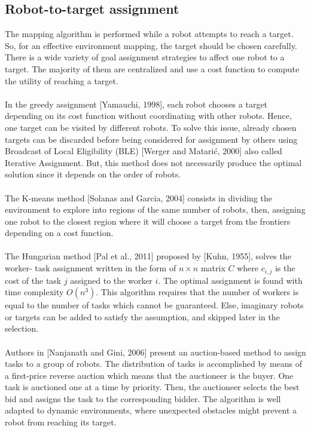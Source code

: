 \documentclass[11pt,openany]{book}
\begin{document}
\subsection{Robot-to-target assignment}
The mapping algorithm is performed while a robot attempts to reach a target. So, for an eﬀective environment mapping, the target should be chosen carefully. There is a wide variety of goal assignment strategies to aﬀect one robot to a target. The majority of them are centralized and use a cost function to compute the utility of reaching a target.\\\\
In the greedy assignment [Yamauchi, 1998], each robot chooses a target depending on its cost function without coordinating with other robots. Hence, one target can be visited by diﬀerent robots. To solve this issue, already chosen targets can be discarded before being considered for assignment by others using Broadcast of Local Eligibility (BLE) [Werger and Matarić, 2000] also called Iterative Assignment. But, this method does not necessarily produce the optimal solution since it depends on the order of robots.\\\\
The K-means method [Solanas and Garcia, 2004] consists in dividing the environment to explore into regions of the same number of robots, then, assigning one robot to the closest region where it will choose a target from the frontiers depending on a cost function.\\\\
The Hungarian method [Pal et al., 2011] proposed by [Kuhn, 1955], solves the worker- task assignment written in the form of $n \times n$ matrix $C$ where $c_{i,j}$ is the cost of the task $j$ assigned to the worker $i$. The optimal assignment is found with time complexity $O(n^3)$. This algorithm requires that the number of workers is equal to the number of tasks which cannot be guaranteed. Else, imaginary robots or targets can be added to satisfy the assumption, and skipped later in the selection.\\\\
Authors in [Nanjanath and Gini, 2006] present an auction-based method to assign tasks to a group of robots. The distribution of tasks is accomplished by means of a ﬁrst-price reverse auction which means that the auctioneer is the buyer. One task is auctioned one at a time by priority. Then, the auctioneer selects the best bid and assigns the task to the corresponding bidder. The algorithm is well adapted to dynamic environments, where unexpected obstacles might prevent a robot from reaching its target.\\\\
\end{document}
